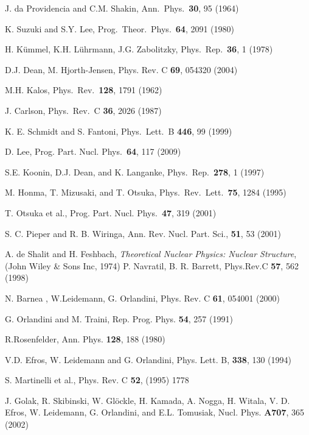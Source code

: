 \begin{thebibliography}{00}
 J. da Providencia and C.M. Shakin, Ann.~Phys.~{\bf 30}, 95 (1964)

 K. Suzuki and S.Y. Lee, Prog.~Theor.~Phys.~{\bf 64},  2091  (1980)

 H. K\"ummel, K.H. L\"uhrmann, J.G. Zabolitzky, Phys.~Rep.~{\bf 36}, 1 (1978)

 D.J. Dean, M. Hjorth-Jensen, Phys. Rev. C  {\bf 69}, 054320 (2004)

 M.H. Kalos,  Phys.~Rev.~{\bf 128},  1791 (1962)

 J. Carlson,  Phys.~Rev.~C {\bf 36},  2026   (1987)

 K. E. Schmidt and S. Fantoni,  Phys.~Lett.~B {\bf 446},  99  (1999)

 D. Lee,   Prog. Part. Nucl. Phys.~{\bf 64}, 117 (2009)

 S.E. Koonin, D.J. Dean, and K. Langanke,  Phys.~Rep.~{\bf 278}, 1 (1997)

 M. Honma, T. Mizusaki, and T. Otsuka,  Phys.~Rev.~Lett.~{\bf 75}, 1284 (1995)

 T. Otsuka et al.,  Prog. Part. Nucl. Phys.~{\bf 47},  319 (2001)

 S. C. Pieper and R. B. Wiringa, Ann. Rev. Nucl. Part. Sci., {\bf 51}, 53 (2001)

 A. de Shalit and H. Feshbach, {\it Theoretical Nuclear Physics: Nuclear Structure}, 
               (John Wiley \& Sons Inc, 1974)                
 P. Navratil, B. R. Barrett, Phys.Rev.C {\bf 57}, 562 (1998)

N. Barnea , W.Leidemann, G. Orlandini, Phys. Rev. C {\bf 61}, 054001 (2000)

 G. Orlandini and M. Traini, Rep. Prog. Phys. {\bf 54}, 257 (1991)

 R.Rosenfelder, Ann. Phys. {\bf 128}, 188 (1980)

 V.D. Efros, W. Leidemann  and G. Orlandini, Phys. Lett. B, {\bf 338}, 130 (1994)

 S. Martinelli et al., Phys. Rev. C {\bf 52}, (1995) 1778

 J. Golak, R. Skibinski, W. Gl\"ockle, H. Kamada, A. Nogga, 
H. Witala, V. D. Efros, W. Leidemann, G. Orlandini, and E.L. Tomusiak, 
Nucl. Phys. {\bf A707}, 365 (2002)
  

\end{thebibliography}
